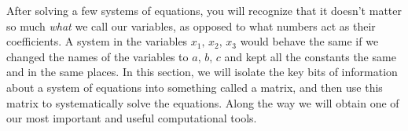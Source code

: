 %
\begin{introduction}
\begin{para}After solving a few systems of equations, you will recognize that it doesn't matter so much {\em what} we call our variables, as opposed to what numbers act as their coefficients.  A system in the variables $x_1,\,x_2,\,x_3$  would behave the same if we changed the names of the variables to $a,\,b,\,c$ and kept all the constants the same and in the same places.  In this section, we will isolate the key bits of information about a system of equations into something called a matrix, and then use this matrix to systematically solve the equations.  Along the way we will obtain one of our most important and useful computational tools.\end{para}
\end{introduction}
%
